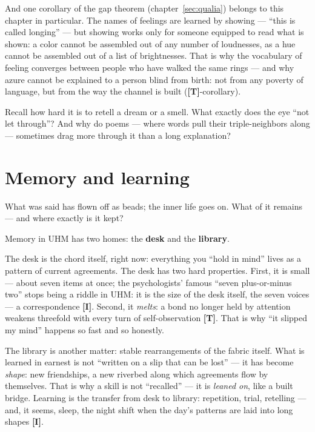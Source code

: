\documentclass[11pt,letterpaper]{article}
\newcommand{\stT}{\textbf{[T]}\xspace}
\newcommand{\stI}{\textbf{[I]}\xspace}
\begin{document}
And one corollary of the gap theorem (chapter~\ref{sec:qualia})
belongs to this chapter in particular. The names of feelings are
learned by showing --- ``this is called longing'' --- but showing
works only for someone equipped to read what is shown: a color
cannot be assembled out of any number of loudnesses, as a hue
cannot be assembled out of a list of brightnesses. That is why the
vocabulary of feeling converges between people who have walked the
same rings --- and why azure cannot be explained to a person blind
from birth: not from any poverty of language, but from the way the
channel is built (\stT-corollary).

\begin{askbox}
Recall how hard it is to retell a dream or a smell. What exactly
does the eye ``not let through''? And why do poems --- where words
pull their triple-neighbors along --- sometimes drag more through
it than a long explanation?
\end{askbox}

\section{Memory and learning}
\label{sec:memory}

What was said has flown off as beads; the inner life goes on. What
of it remains --- and where exactly is it kept?

Memory in UHM has two homes: the \textbf{desk} and the
\textbf{library}.

The desk is the chord itself, right now: everything you ``hold in
mind'' lives as a pattern of current agreements. The desk has two
hard properties. First, it is small --- about seven items at once;
the psychologists' famous ``seven plus-or-minus two'' stops being a
riddle in UHM: it is the size of the desk itself, the seven voices
--- a correspondence \stI. Second, it \emph{melts}: a bond no
longer held by attention weakens threefold with every turn of
self-observation \stT. That is why ``it slipped my mind'' happens
so fast and so honestly.

The library is another matter: stable rearrangements of the fabric
itself. What is learned in earnest is not ``written on a slip that
can be lost'' --- it has become \emph{shape}: new friendships, a
new riverbed along which agreements flow by themselves. That is why
a skill is not ``recalled'' --- it is \emph{leaned on}, like a
built bridge. Learning is the transfer from desk to library:
repetition, trial, retelling --- and, it seems, sleep, the night
shift when the day's patterns are laid into long shapes \stI.
\end{document}
